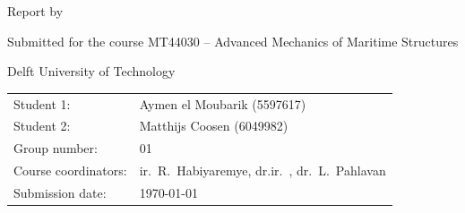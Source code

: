 \begin{titlepage}

\begin{center}

{\makeatletter\headingfont
\fontsize{60}{60}\selectfont\@title{}
\makeatother}

{\makeatletter
\ifx\@subtitle\undefined\else
  \bigskip
  {\headingfont\fontsize{22}{32}\selectfont\@subtitle}
\fi
\makeatother}

\bigskip
\bigskip

Report by

\bigskip
\bigskip

{\makeatletter
\fontsize{26}{26}\selectfont\@author{}
\makeatother}

\bigskip
\bigskip

Submitted for the course MT44030 -- Advanced Mechanics of Maritime Structures

Delft University of Technology

\vfill

\begin{tabular}{ll}
  Student 1: & Aymen el Moubarik (5597617) \\
  Student 2: & Matthijs Coosen (6049982) \\
  Group number: & 01 \\
  Course coordinators: & ir.\ R.\ Habiyaremye, dr.ir.\ , dr.\ L.\ Pahlavan \\
  Submission date: & \today
\end{tabular}

\vspace{25mm}
\makeatletter
\scalebox{3}{
  \if@print%
    \tudlogo[black]
  \else
    \tudlogo%
  \fi
}
\makeatother
\end{center}

\end{titlepage}
